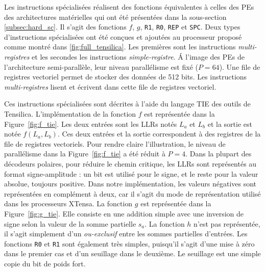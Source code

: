 Les instructions spécialisées réalisent des fonctions équivalentes à celles des PEs des architectures matérielles qui ont été présentées dans la sous-section \ref{subsec:hard_sc}. Il s'agit des fonctions $f$, $g$, \texttt{R1}, \texttt{R0}, \texttt{REP} et \texttt{SPC}. Deux types d'instructions spécialisées ont été conçues et ajoutées au processeur proposé comme montré dans \ref{fig:full_tensilica}. Les premières sont les instructions \textit{multi-registres} et les secondes les instructions \textit{simple-registre}. \'A l'image des PEs de l'architecture semi-parallèle, leur niveau parallélisme est fixé ($P=64$). Une file de registres vectoriel permet de stocker des données de 512 bits. Les instructions \textit{multi-registres} lisent et écrivent dans cette file de registres vectoriel.

Ces instructions spécialisées sont décrites à l'aide du langage TIE des outils de Tensilica.
L'implémentation de la fonction $f$ est représentée dans la Figure~\ref{fig:f_tie}. Les deux entrées sont les LLRs notés $L_a$ et $L_b$ et la sortie est notée $f(L_a,L_b)$. Ces deux entrées et la sortie correspondent à des registres de la file de registres vectoriels. Pour rendre claire l'illustration, le niveau de parallélisme dans la Figure~\ref{fig:f_tie} a été réduit à $P=4$. Dans la plupart des décodeurs polaires, pour réduire le chemin critique, les LLRs sont représentés au format \og signe-amplitude \fg : un bit est utilisé pour le signe, et le reste pour la valeur absolue, toujours positive. Dans notre implémentation, les valeurs négatives sont représentées en complément à deux, car il s'agit du mode de représentation utilisé dans les processeurs XTensa.
La fonction $g$ est représentée dans la Figure~\ref{fig:g_tie}. Elle consiste en une addition simple avec une inversion de signe selon la valeur de la somme partielle $s_a$.
La fonction $h$ n'est pas représentée, il s'agit simplement d'un \textit{ou-exclusif} entre les sommes partielles d'entrées. Les fonctions \texttt{R0} et \texttt{R1} sont également très simples, puisqu'il s'agit d'une mise à zéro dans le premier cas et d'un seuillage dans le deuxième. Le seuillage est une simple copie du bit de poids fort.
